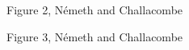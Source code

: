 \documentclass[prl,twocolumn,showpacs,twocolumngrid,superbib]{revtex4}
\begin{document}
{\clearpage

\begin{center}
Figure 2, N{\'e}meth and Challacombe \\[1.cm]
\end{center}

\clearpage

\begin{center}
Figure 3, N{\'e}meth and Challacombe \\[1.cm]
\end{center}

\clearpage

}
\end{document}
